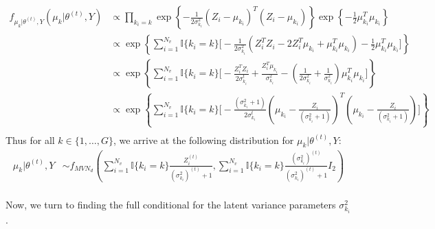 \documentclass{article}
\begin{document}
\begin{align*}
f_{\mu_{k}|\theta^{(t)}, Y}(\mu_k|\theta^{(t)},Y) &\propto \prod_{k_i = k} \exp\left\{-\frac{1}{2\sigma_{k_i}^2}(Z_i - \mu_{k_i})^T(Z_i - \mu_{k_i})\right\}\exp\left\{-\frac{1}{2}\mu_{k_i}^T\mu_{k_i}\right\}\\
&\propto \exp\left\{\sum_{i = 1}^{N_v}\mathbb{I}\{k_i = k\} \Big[-\frac{1}{2\sigma_{k_i}^2}(Z_i^TZ_i - 2Z_i^T\mu_{k_i} + \mu_{k_i}^T\mu_{k_i}) - \frac{1}{2}\mu_{k_i}^T\mu_{k_i} \Big]\right\}\\
&\propto\exp\left\{\sum_{i = 1}^{N_v}\mathbb{I}\{k_i = k\} \Big[-\frac{Z_i^TZ_i}{2\sigma_{k_i}^t} + \frac{Z_i^T\mu_{k_i}}{\sigma_{k_i}^2} - \left(\frac{1}{2\sigma_{k_i}^2} + \frac{1}{\sigma_{k_i}^2}\right)\mu_{k_i}^T\mu_{k_i} \Big] \right\}\\
&\propto\exp\left\{\sum_{i = 1}^{N_v}\mathbb{I}\{k_i = k\} \Big[-\frac{(\sigma_{k_i}^2+1)}{2\sigma_{k_i}^t}\left(\mu_{k_i}-\frac{Z_i}{(\sigma_{k_i}^2+1)}\right)^T\left(\mu_{k_i}-\frac{Z_i}{(\sigma_{k_i}^2+1)}\right)\Big]\right\}\\
\end{align*}
Thus for all $k \in \{1, \ldots, G\}$, we arrive at the following distribution for $\mu_k | \theta^{(t)}, Y$:
\begin{align*}
\mu_{k}|\theta^{(t)},Y&\sim f_{{MVN}_d} \left(\sum_{i = 1}^{N_v}\mathbb{I}\{k_i = k\}\frac{Z_i^{(t)}}{(\sigma_{k_i}^2)^{(t)}+1}, \sum_{i = 1}^{N_v}\mathbb{I}\{k_i = k\}\frac{(\sigma_{k_i}^2)^{(t)}}{(\sigma_{k_i}^2)^{(t)}+1}I_2\right)\\
\end{align*}

Now, we turn to finding the full conditional for the latent variance parameters $\sigma_{k_i}^2$. 
\end{document}
